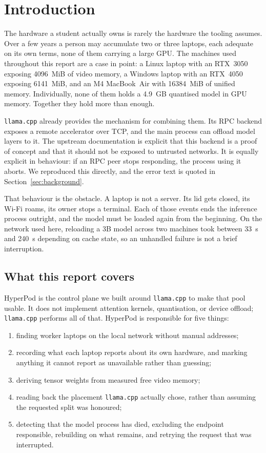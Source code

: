 \section{Introduction}

The hardware a student actually owns is rarely the hardware the tooling assumes.
Over a few years a person may accumulate two or three laptops, each adequate on
its own terms, none of them carrying a large GPU. The machines used throughout
this report are a case in point: a Linux laptop with an RTX~3050 exposing
\SI{4096}{MiB} of video memory, a Windows laptop with an RTX~4050 exposing
\SI{6141}{MiB}, and an M4 MacBook~Air with \SI{16384}{MiB} of unified memory.
Individually, none of them holds a 4.9~GB quantised model in GPU memory.
Together they hold more than enough.

\texttt{llama.cpp} already provides the mechanism for combining them. Its RPC
backend exposes a remote accelerator over TCP, and the main process can offload
model layers to it. The upstream documentation is explicit that this backend is
a proof of concept and that it should not be exposed to untrusted networks. It
is equally explicit in behaviour: if an RPC peer stops responding, the process
using it aborts. We reproduced this directly, and the error text is quoted in
Section~\ref{sec:background}.

That behaviour is the obstacle. A laptop is not a server. Its lid gets closed,
its Wi-Fi roams, its owner stops a terminal. Each of those events ends the
inference process outright, and the model must be loaded again from the
beginning. On the network used here, reloading a 3B model across two machines
took between \SI{33}{\second} and \SI{240}{\second} depending on cache state,
so an unhandled failure is not a brief interruption.

\subsection{What this report covers}

HyperPod is the control plane we built around \texttt{llama.cpp} to make that
pool usable. It does not implement attention kernels, quantisation, or device
offload; \texttt{llama.cpp} performs all of that. HyperPod is responsible for
five things:

\begin{enumerate}[leftmargin=1.4em,itemsep=2pt]
  \item finding worker laptops on the local network without manual addresses;
  \item recording what each laptop reports about its own hardware, and marking
        anything it cannot report as unavailable rather than guessing;
  \item deriving tensor weights from measured free video memory;
  \item reading back the placement \texttt{llama.cpp} actually chose, rather
        than assuming the requested split was honoured;
  \item detecting that the model process has died, excluding the endpoint
        responsible, rebuilding on what remains, and retrying the request that
        was interrupted.
\end{enumerate}

